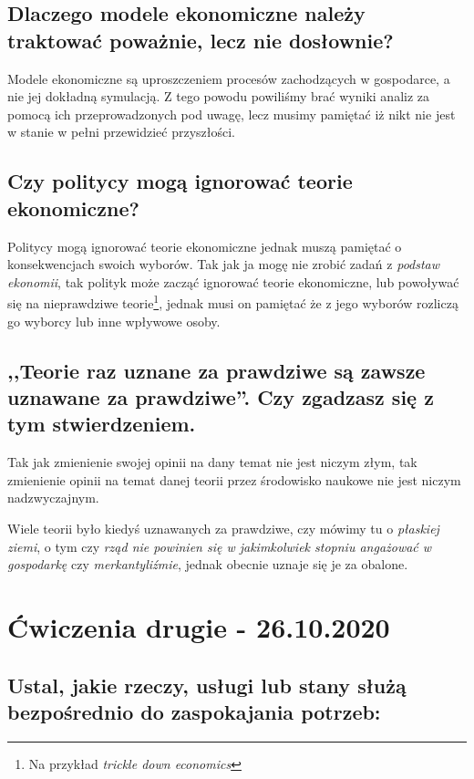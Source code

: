 \documentclass[a4paper,12pt]{article}
\let\oldsection\section
\renewcommand\section{\clearpage\oldsection}
\begin{document}
\subsection{Dlaczego modele ekonomiczne należy traktować poważnie, lecz nie dosłownie?}

Modele ekonomiczne są uproszczeniem procesów zachodzących w gospodarce, a nie jej dokładną symulacją. Z tego powodu powiliśmy brać wyniki analiz za pomocą ich przeprowadzonych pod uwagę, lecz musimy pamiętać iż nikt nie jest w stanie w pełni przewidzieć przyszłości.

\subsection{Czy politycy mogą ignorować teorie ekonomiczne?}

Politycy mogą ignorować teorie ekonomiczne jednak muszą pamiętać o konsekwencjach swoich wyborów. Tak jak ja mogę nie zrobić zadań z \emph{podstaw ekonomii}, tak polityk może zacząć ignorować teorie ekonomiczne, lub powoływać się na nieprawdziwe teorie\footnote{Na przykład \emph{trickle down economics}}, jednak musi on pamiętać że z jego wyborów rozliczą go wyborcy lub inne wpływowe osoby.

\subsection{,,Teorie raz uznane za prawdziwe są zawsze uznawane za prawdziwe''. Czy zgadzasz się z tym stwierdzeniem.}

Tak jak zmienienie swojej opinii na dany temat nie jest niczym złym, tak zmienienie opinii na temat danej teorii przez środowisko naukowe nie jest niczym nadzwyczajnym.

Wiele teorii było kiedyś uznawanych za prawdziwe, czy mówimy tu o \emph{płaskiej ziemi}, o tym czy \emph{rząd nie powinien się w jakimkolwiek stopniu angażować w gospodarkę} czy \emph{merkantyliźmie}, jednak obecnie uznaje się je za obalone.

\section{Ćwiczenia drugie - 26.10.2020}

\subsection{Ustal, jakie rzeczy, usługi lub stany służą bezpośrednio do zaspokajania potrzeb:}
\end{document}
